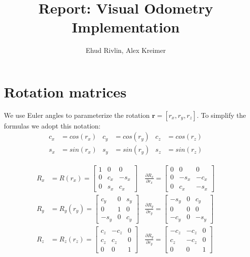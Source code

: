 \documentclass[10pt]{article}         %
\title{Report: Visual Odometry Implementation}
\author{Ehud Rivlin, Alex Kreimer}
\begin{document}
\maketitle

\section{Rotation matrices}
\label{sec: rot_mat}
We use Euler angles to parameterize the rotation $\mathbf{r} = [r_x,r_y,r_z]$. To simplify the formulas we adopt this notation:
\begin{align*}
  c_x &= cos(r_x) & c_y &= cos(r_y) & c_z&=cos(r_z) \\
  s_x &= sin(r_x) & s_y &= sin(r_y) & s_z&=sin(r_z)
\end{align*}

\begin{align*}
R_x&= R(r_x) = 
\begin{bmatrix}
1& 0& 0\\
0& c_x& -s_x\\
0& s_x& c_x
\end{bmatrix} &\frac{\partial R_x}{\partial r_x} = \begin{bmatrix}
0& 0& 0\\
0& -s_x& -c_x\\
0& c_x& -s_x
\end{bmatrix}\\
R_y&=R_y(r_y) = \begin{bmatrix}
c_y& 0& s_y\\
0& 1& 0\\
-s_y& 0& c_y
\end{bmatrix} &\frac{\partial R_y}{\partial r_y} = \begin{bmatrix}
-s_y& 0& c_y\\
0& 0& 0\\
-c_y& 0& -s_y
\end{bmatrix}\\
R_z &= R_z(r_z) = \begin{bmatrix}
c_z& -c_z& 0\\
c_z& c_z& 0\\
0& 0& 1
\end{bmatrix} &\frac{\partial R_y}{\partial r_y} = \begin{bmatrix}
-c_z& -c_z& 0\\
c_z& -c_z& 0\\
0& 0& 1
\end{bmatrix}
\end{align*}
\end{document}
